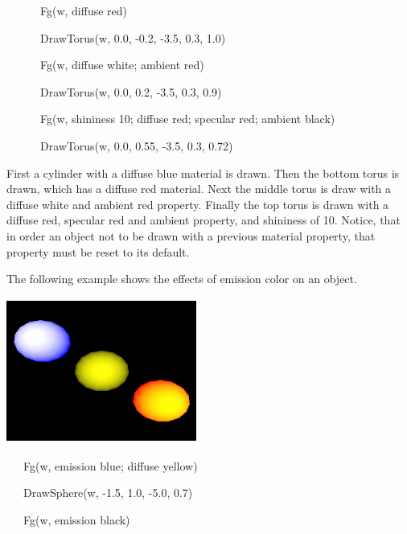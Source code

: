 \documentclass[letterpaper]{article}
\begin{document}
{\sffamily
\ \ \ \ \ \ Fg(w, {\textquotedbl}diffuse red{\textquotedbl})}

{\sffamily
\ \ \ \ \ \ DrawTorus(w, 0.0, -0.2, -3.5, 0.3, 1.0)}

{\sffamily
\ \ \ \ \ \ Fg(w, {\textquotedbl}diffuse white; ambient red{\textquotedbl})}

{\sffamily
\ \ \ \ \ \ DrawTorus(w, 0.0, 0.2, -3.5, 0.3, 0.9)}

{\sffamily
\ \ \ \ \ \ Fg(w, {\textquotedbl}shininess 10; diffuse red; specular red; ambient black{\textquotedbl})}

{\sffamily
\ \ \ \ \ \ DrawTorus(w, 0.0, 0.55, -3.5, 0.3, 0.72)}


\bigskip

{
First a cylinder with a diffuse blue material is drawn. Then the bottom torus is drawn, which has a diffuse red
material. Next the middle torus is draw with a diffuse white and ambient red property. Finally the top torus is drawn
with a diffuse red, specular red and ambient property, and shininess of 10. Notice, that in order an object not to be
drawn with a previous material property, that property must be reset to its default. }

{
The following example shows the effects of emission color on an object. }


\bigskip

{\centering  \includegraphics[width=2.4598in,height=1.8799in]{utr9/utr9-img025.png} \par}

\bigskip

{\sffamily
\ \ \ Fg(w, {\textquotedbl}emission blue; diffuse yellow{\textquotedbl}) }

{\sffamily
\ \ \ DrawSphere(w, -1.5, 1.0, -5.0, 0.7)}

{\sffamily
\ \ \ Fg(w, {\textquotedbl}emission black{\textquotedbl})}
\end{document}
